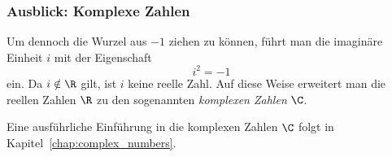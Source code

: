 \subsubsection{Ausblick: Komplexe Zahlen}
\label{subsubsec:fundamentals_complex_numbers}

Um dennoch die Wurzel aus $-1$ ziehen zu können, führt man die imaginäre
Einheit $i$ mit der Eigenschaft
\[
  i^2=-1
\]
ein. Da $i\notin\R$ gilt, ist $i$ keine reelle Zahl. Auf diese Weise erweitert
man die reellen Zahlen $\R$ zu den sogenannten \emph{komplexen Zahlen} $\C$.

\begin{center}
  \begingroup
    \def\NumberSetStage{5}
  \endgroup
\end{center}

Eine ausführliche Einführung in die komplexen Zahlen $\C$ folgt in
Kapitel~\ref{chap:complex_numbers}.

